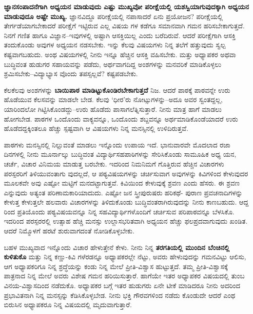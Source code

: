 \textbf{ಜ್ಞಾನಸಂಪಾದನೆಗಾಗಿ ಅಧ್ಯಯನ ಮಾಡುವುದು ಎಷ್ಟು ಮುಖ್ಯವೋ ಪರೀಕ್ಷೆಯಲ್ಲಿ ಯಶಸ್ವಿಯಾಗುವುದಕ್ಕಾಗಿ ಅಧ್ಯಯನ ಮಾಡುವುದೂ ಅಷ್ಟೇ ಮುಖ್ಯ.} ಜ್ಞಾನವಿದ್ದೂ ಪರೀಕ್ಷೆಯಲ್ಲಿ ನಪಾಸಾದರೆ ಏನು ಪ್ರಯೋಜನ? ಪರೀಕ್ಷೆಯಲ್ಲಿ ತೇರ್ಗಡೆಯಾಗಬೇಕಾದರೆ ಪರೀಕ್ಷೆಗೆ ಇಟ್ಟಿರುವ ಎಲ್ಲ ವಿಷಯ ಗಳ ಕಡೆಗೂ ಸಮಾನವಾಗಿ ಗಮನ ಹರಿಸಬೇಕಾಗುತ್ತದೆ. ನಿನಗೆ ಗಣಿತ ಹಾಗೂ ವಿಜ್ಞಾನ–ಇವುಗಳಲ್ಲಿ ಅಷ್ಟಾಗಿ ಆಸಕ್ತಿಯಿಲ್ಲ ಎಂದು ಬರೆದಿರುವೆ. ಆದರೆ ಪರೀಕ್ಷೆಗಾಗಿ ಆಸಕ್ತಿ ತಂದುಕೊಂಡು ಅವುಗಳ ಅಧ್ಯಯನ ನಡಸಬೇಕು. ಇನ್ನು ಕೆಲವು ವಿಷಯಗಳು ನಿನ್ನ ತಲೆಗೆ ಹತ್ತುವುದು ಸ್ವಲ್ಪ ಕಷ್ಟವಾಗಬಹುದು. ಅಂಥ ವಿಷಯಗಳಲ್ಲಿ ನೀನು ಇನ್ನೂ ಹೆಚ್ಚಿನ ಆಸಕ್ತಿ ವಹಿಸಬೇಕು. ಮತ್ತು ಅಧ್ಯಾಪಕರ ಅಥವಾ ಬುದ್ಧಿವಂತ ಹುಡುಗರ ಸಹಾಯವನ್ನು ಪಡೆದು, ಅರ್ಥವಾಗದಿದ್ದ ಅಂಶಗಳನ್ನು ಮನವರಿಕೆ ಮಾಡಿಕೊಳ್ಳಲು ಶ್ರಮಿಸಬೇಕು–ವಿದ್ಯಾಭ್ಯಾಸ ವೊಂದು ತಪಸ್ಸಲ್ಲವೆ? ಕಷ್ಟಪಡಬೇಕು.

ಕೆಲಕೆಲವು ಅಂಶಗಳನ್ನು \textbf{ಬಾಯಿಪಾಠ ಮಾಡಿಟ್ಟುಕೊಂಡಿರಬೇಕಾಗುತ್ತದೆ} ನಿಜ. ಆದರೆ ಪಾಠಕ್ಕೆ ಪಾಠವನ್ನೇ ಉರು ಹೊಡೆಯುವ ಕೆಲಸವನ್ನು ಮಾಡಲೇ ಬೇಡ. ಕೆಲವು ‘ಧೀರ’ರು ನೋಟ್ಸುಗಳನ್ನು–ಅದೂ ಅವರ ಸ್ವಂತದ್ದಲ್ಲ, ಯಾರಿಂದಲೋ ಗಿಟ್ಟಿಸಿಕೊಂಡದ್ದು–ಉರು ಹೊಡೆದು ಪಾಸಾಗಲೆತ್ನಿಸುತ್ತಾರೆ. ನೀನು ಮಾತ್ರ ಹಾಗೆ ಮಾಡಲು ಹೋಗಬೇಡ. ಪಾಠಗಳ ಒಂದೊಂದು ವಾಕ್ಯವನ್ನೂ, ಒಂದೊಂದು ಶಬ್ದವನ್ನೂ ಅರ್ಥಮಾಡಿಕೊಂಡೆಯಾದರೆ ಉರು ಹೊಡೆದದ್ದಕ್ಕಿಂತಲೂ ಹೆಚ್ಚು ಸ್ಪಷ್ಟವಾಗಿ ಆ ವಿಷಯಗಳು ನಿನ್ನ ಮನಸ್ಸಿನಲ್ಲಿ ಉಳಿದಿರುತ್ತವೆ.

ಪಾಠಗಳು ಮನಸ್ಸಿನಲ್ಲಿ ನಿಲ್ಲುವಂತೆ ಮಾಡಲು ಇನ್ನೊಂದು ಉಪಾಯ ಇದೆ. ಭಾನುವಾರವೇ ಮೊದಲಾದ ರಜಾ ದಿನಗಳಲ್ಲಿ ನೀನು ಮೂರ್ನಾಲ್ಕು ಬುದ್ಧಿವಂತ ವಿದ್ಯಾರ್ಥಿಸಹಪಾಠಿಗಳನ್ನು ಸೇರಿಸಿಕೊಂಡು ಸಾಮೂಹಿಕ ಅಧ್ಯ ಯನ, ಚರ್ಚೆ, ವಿಚಾರ ವಿನಿಮಯ ಮಾಡುತ್ತ ಬರಬೇಕು. ಇದರಿಂದ ನಿಮನಿಮಗೆ ಗೊತ್ತಿರುವ ಹೆಚ್ಚಿನ ವಿಚಾರಗಳು ಪರಸ್ಪರರಿಗೆ ತಿಳಿಯುವಂತಾಗು ವುದಲ್ಲದೆ, ಆ ಪಠ್ಯವಿಷಯಗಳನ್ನು ಚರ್ಚಿಸುವಾಗ ಅವುಗಳನ್ನು ಕಿವಿಗಳಿಂದ ಕೇಳುವುದರ ಮೂಲಕವೇ ಅವು ಎಷ್ಟೋ ಮಟ್ಟಿಗೆ ಮನದಟ್ಟಾಗುತ್ತವೆ. ಕಿವಿಯಿಂದ ಕೇಳುವುಕ್ಕೆ ಶ್ರವಣ ಎಂದು ಹೆಸರು. ಈ ಶ್ರವಣ ಎನ್ನುವುದು ಅತ್ಯಂತ ಪರಿಣಾಮಕಾರಿಯಾದುದು. ಎಷ್ಟೋ ಜನ ಸ್ತ್ರೀಪುರುಷರು ಹರಿಕಥೆ- ಪುರಾಣ ಪ್ರವಚನಾದಿಗಳನ್ನು ಕೇಳುತ್ತ ಕೇಳುತ್ತಲೇ ಹಲವಾರು ವಿಚಾರಗಳನ್ನು ತಿಳಿದುಕೊಂಡು ಬುದ್ಧಿವಂತರಾಗಿರುವುದನ್ನು ನೀನು ಕಾಣಬಹುದು. ಆದ್ದ ರಿಂದ ಪ್ರತಿಯೊಂದು ಪಠ್ಯವಿಷಯವನ್ನೂ ನಿನ್ನ ಸಹವಿದ್ಯಾರ್ಥಿಗಳೊಂದಿಗೆ ಚರ್ಚಿಸುವ ಪರಿಪಾಠವನ್ನೂ ಬೆಳಸಿಕೊ. ಇದರಿಂದ ಪರಸ್ಪರರಲ್ಲಿ ಉತ್ಸಾಹ ಹೆಚ್ಚಿ ಮನಸ್ಸು ಉಲ್ಲಾಸಭರಿತವಾಗಿ ಅಧ್ಯಯನ ಹೆಚ್ಚು ಫಲಪ್ರದವಾಗುವುದು ಖಂಡಿತ. ಆದರೆ ನಿಮ್ಮೊಳಗೆ ಹರಟೆ ಶುರುವಾಗದಂತೆ ನೋಡಿಕೊಳ್ಳಬೇಕು.

ಬಹಳ ಮುಖ್ಯವಾದ ಇನ್ನೊಂದು ವಿಚಾರ ಹೇಳುತ್ತೇನೆ ಕೇಳು. ನೀನು ನಿನ್ನ \textbf{ತರಗತಿಯಲ್ಲಿ ಮುಂದಿನ ಬೆಂಚಿನಲ್ಲಿ ಕುಳಿತುಕೊ} ಮತ್ತು ನಿನ್ನ ಕಣ್ಣು-ಕಿವಿ ಗಳೆರಡನ್ನೂ ಅಧ್ಯಾಪಕರಲ್ಲೇ ನೆಟ್ಟು, ಅವರು ಹೇಳುವುದನ್ನು ಗಮನವಿಟ್ಟು ಆಲಿಸು, ಆಗ ಅಧ್ಯಾಪಕರಿಗೂ ನಿನ್ನ ಶ್ರದ್ಧೆಯನ್ನು ಕಂಡು ನಿನ್ನ ಮೇಲೆ ಪ್ರೀತಿ-ವಿಶ್ವಾಸ ಹುಟ್ಟುತ್ತದೆ. ತಮ್ಮ ಪ್ರೀತಿ-ವಿಶ್ವಾಸಕ್ಕೆ ಪಾತ್ರನಾದ ನಿನ್ನ ಮೇಲೆ ಅವರು ವಿಶೇಷ ಗಮನ ಹರಿಯಿಸುತ್ತಾರೆ. ಹಾಗೆಯೇ ಇತರ ಅಧ್ಯಾಪಕರ ವಿಷಯದಲ್ಲಿ ತುಂಬ ವಿನಯ-ವಿಶ್ವಾಸದಿಂದ ನಡೆದುಕೊ. ಅಧ್ಯಾಪಕರ ಬಗ್ಗೆ ಇತರ ಹುಡುಗರು ಏನೇ ಟೀಕೆ ಮಾಡಿದರೂ ನೀನು ಅದರಿಂದ ಪ್ರಭಾವಿತನಾಗಿ ನಿನ್ನ ಮನಸ್ಸನ್ನು ಕೆಡಿಸಿಕೊಳ್ಳಬೇಡ. ನೀನು ಭಕ್ತಿ ಗೌರವಗಳಿಂದ ನಡೆದು ಕೊಂಡುದೇ ಆದರೆ ಎಂಥ ಬಿರುಸಿನ ಅಧ್ಯಾಪಕರೂ ನಿನ್ನ ವಿಷಯದಲ್ಲಿ ಮೃದುವಾಗುತ್ತಾರೆ.

